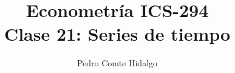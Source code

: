 \documentclass{beamer}
\title[ICS-162]{Econometría ICS-294\\ \small{Clase 21: Series de tiempo}}
\author{Pedro Comte Hidalgo}
\institute[USM]
{Universidad Técnica Federico Santa María\\ %
	\medskip
	\textit{} %
	
}
\date{}
\begin{document}
\frame{\titlepage}







\end{document}
